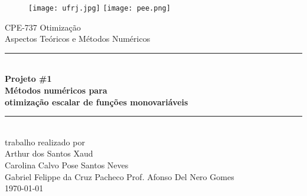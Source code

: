 \thispagestyle{empty}
\begin{center}
\begin{figure}[h!]
	\texttt{[image: ufrj.jpg]}
	\hfill
	\texttt{[image: pee.png]}
\end{figure}
\vfill
{\Huge CPE-737 Otimização \\ {\huge Aspectos Teóricos e Métodos Numéricos}}
\vspace{15pt}
\vfill
\rule[2mm]{150mm}{0.2mm}\\
{\bf {\huge Projeto \#1 \\ }
\vspace{0.2cm}
{\Large Métodos numéricos para \\ otimização escalar de funções monovariáveis\\ }
\vspace{0.1cm}}
\rule[-2mm]{150mm}{0.2mm}\\
\vfill
trabalho realizado por \\
\vspace{15pt}
{\large  Arthur {\sc dos Santos Xaud}} \\
{\large  Carolina {\sc Calvo Pose Santos Neves}} \\
{\large  Gabriel {\sc Felippe da Cruz Pacheco}}
\vfill
{ Prof. Afonso {\sc Del Nero Gomes} \\ \vspace{5pt} \today}\\
\end{center}
